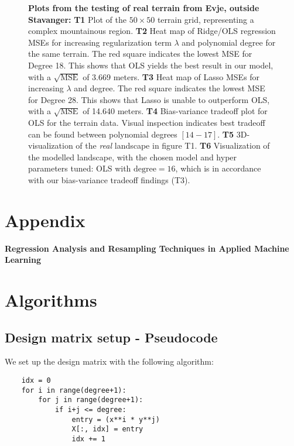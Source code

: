 \documentclass{article}
\begin{document}
\begin{figure}[H]
{\begin{minipage}{\textwidth}
        \vspace{1em}
        \caption*{\textbf{Plots from the testing of real terrain from Evje, outside Stavanger: }\textbf{T1} Plot of the $50 \times 50$ terrain grid, representing a complex mountainous region. \textbf{T2} Heat map of Ridge/OLS regression MSEs for increasing regularization term $\lambda$ and polynomial degree for the same terrain. The red square indicates the lowest MSE for Degree 18. This shows that OLS yields the best result in our model, with a $\sqrt{\text{MSE}}$ of 3.669 meters. \textbf{T3} Heat map of Lasso MSEs for increasing $\lambda$ and degree. The red square indicates the lowest MSE for Degree 28. This shows that Lasso is unable to outperform OLS, with a $\sqrt{\text{MSE}}$ of 14.640 meters. \textbf{T4} Bias-variance tradeoff plot for OLS for the terrain data. Visual inspection indicates best tradeoff can be found between polynomial degrees $[14-17]$. \textbf{T5} 3D-visualization of the \textit{real} landscape in figure T1. \textbf{T6} Visualization of the modelled landscape, with the chosen model and hyper parameters tuned: OLS with $\text{degree} = 16$, which is in accordance with our bias-variance tradeoff findings (T3).}
        \label{fig:terr_figs}
    \end{minipage}
    }
\end{figure}


\newpage


\appendix
\section*{Appendix}
\noindent \textbf{Regression Analysis and Resampling Techniques in Applied Machine Learning}

\section{Algorithms}
\label{app:something}
\subsection{Design matrix setup - Pseudocode}
\label{app_alg:design_matrix}
We set up the design matrix with the following algorithm:
\begin{lstlisting}
    idx = 0
    for i in range(degree+1):
        for j in range(degree+1): 
            if i+j <= degree:
                entry = (x**i * y**j)
                X[:, idx] = entry
                idx += 1
\end{lstlisting}
\end{document}
